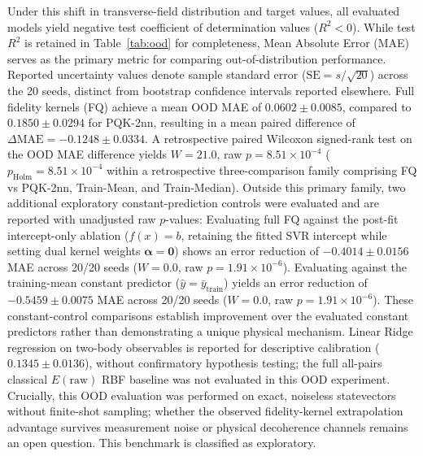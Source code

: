 \documentclass[conference]{IEEEtran}
\begin{document}
Under this shift in transverse-field distribution and target values, all evaluated models yield negative test coefficient of determination values ($R^2 < 0$). While test $R^2$ is retained in Table~\ref{tab:ood} for completeness, Mean Absolute Error (MAE) serves as the primary metric for comparing out-of-distribution performance. Reported uncertainty values denote sample standard error ($\mathrm{SE} = s/\sqrt{20}$) across the 20 seeds, distinct from bootstrap confidence intervals reported elsewhere. Full fidelity kernels (FQ) achieve a mean OOD MAE of $0.0602 \pm 0.0085$, compared to $0.1850 \pm 0.0294$ for PQK-2nn, resulting in a mean paired difference of $\Delta\mathrm{MAE} = -0.1248 \pm 0.0334$. A retrospective paired Wilcoxon signed-rank test on the OOD MAE difference yields $W=21.0$, raw $p=8.51\times 10^{-4}$ ($p_{\mathrm{Holm}}=8.51\times 10^{-4}$ within a retrospective three-comparison family comprising FQ vs PQK-2nn, Train-Mean, and Train-Median). Outside this primary family, two additional exploratory constant-prediction controls were evaluated and are reported with unadjusted raw $p$-values:  Evaluating full FQ against the post-fit intercept-only ablation ($f(x) = b$, retaining the fitted SVR intercept while setting dual kernel weights $\boldsymbol{\alpha} = \mathbf{0}$) shows an error reduction of $-0.4014 \pm 0.0156$ MAE across 20/20 seeds ($W=0.0$, raw $p=1.91\times 10^{-6}$). Evaluating against the training-mean constant predictor ($\hat{y} = \bar{y}_{\mathrm{train}}$) yields an error reduction of $-0.5459 \pm 0.0075$ MAE across 20/20 seeds ($W=0.0$, raw $p=1.91\times 10^{-6}$). These constant-control comparisons establish improvement over the evaluated constant predictors rather than demonstrating a unique physical mechanism. Linear Ridge regression on two-body observables is reported for descriptive calibration ($0.1345 \pm 0.0136$), without confirmatory hypothesis testing; the full all-pairs classical $E(\text{raw})$ RBF baseline was not evaluated in this OOD experiment. Crucially, this OOD evaluation was performed on exact, noiseless statevectors without finite-shot sampling; whether the observed fidelity-kernel extrapolation advantage survives measurement noise or physical decoherence channels remains an open question. This benchmark is classified as exploratory.


\end{document}
